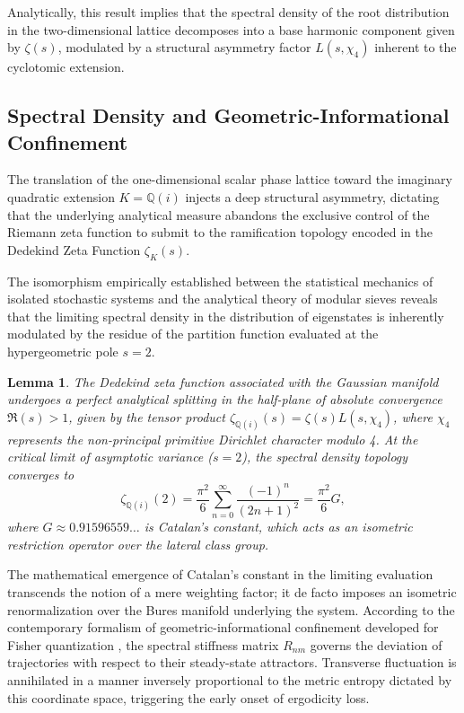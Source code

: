 \documentclass{article}
\numberwithin{equation}{section}
\theoremstyle{plain}
\newtheorem{lemma}[theorem]{Lemma}
\theoremstyle{definition}
\begin{document}
Analytically, this result implies that the spectral density of the root distribution in the two-dimensional lattice decomposes into a base harmonic component given by $\zeta(s)$, modulated by a structural asymmetry factor $L(s, \chi_4)$ inherent to the cyclotomic extension.

\subsection{Spectral Density and Geometric-Informational Confinement}

The translation of the one-dimensional scalar phase lattice toward the imaginary quadratic extension $K = \mathbb{Q}(i)$ injects a deep structural asymmetry, dictating that the underlying analytical measure abandons the exclusive control of the Riemann zeta function to submit to the ramification topology encoded in the Dedekind Zeta Function $\zeta_K(s)$.

The isomorphism empirically established between the statistical mechanics of isolated stochastic systems and the analytical theory of modular sieves reveals that the limiting spectral density in the distribution of eigenstates is inherently modulated by the residue of the partition function evaluated at the hypergeometric pole $s=2$.

\begin{lemma}
The Dedekind zeta function associated with the Gaussian manifold undergoes a perfect analytical splitting in the half-plane of absolute convergence $\Re(s) > 1$, given by the tensor product $\zeta_{\mathbb{Q}(i)}(s) = \zeta(s) L(s, \chi_4)$, where $\chi_4$ represents the non-principal primitive Dirichlet character modulo 4. At the critical limit of asymptotic variance ($s=2$), the spectral density topology converges to
\begin{equation}
    \zeta_{\mathbb{Q}(i)}(2) = \frac{\pi^2}{6} \sum_{n=0}^{\infty} \frac{(-1)^n}{(2n+1)^2} = \frac{\pi^2}{6} G,
\end{equation}
where $G \approx 0.91596559\dots$ is Catalan's constant, which acts as an isometric restriction operator over the lateral class group.
\end{lemma}

The mathematical emergence of Catalan's constant in the limiting evaluation transcends the notion of a mere weighting factor; it de facto imposes an isometric renormalization over the Bures manifold underlying the system. According to the contemporary formalism of geometric-informational confinement developed for Fisher quantization \cite{BlumMerwin2026}, the spectral stiffness matrix $R_{nm}$ governs the deviation of trajectories with respect to their steady-state attractors. Transverse fluctuation is annihilated in a manner inversely proportional to the metric entropy dictated by this coordinate space, triggering the early onset of ergodicity loss.
\end{document}
